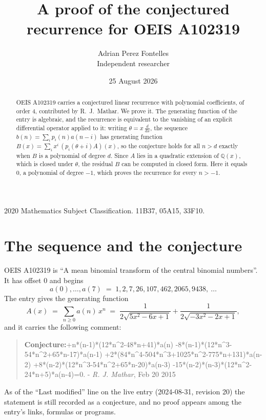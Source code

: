\documentclass[11pt,a4paper]{article}
\title{A proof of the conjectured recurrence for OEIS A102319}
\author{Adrian Perez Fontelles\\ \small Independent researcher}
\date{25 August 2026}
\theoremstyle{plain}
\theoremstyle{definition}
\begin{document}
\maketitle

\begin{abstract}
OEIS A102319 carries a conjectured linear recurrence with polynomial coefficients, of
order 4, contributed by R.~J.~Mathar. We prove it. The generating function of the
entry is algebraic, and the recurrence is equivalent to the vanishing of an explicit
differential operator applied to it: writing $\theta=x\,\frac{d}{dx}$, the sequence
$b(n)=\sum_{i}p_{i}(n)a(n-i)$ has generating function
$B(x)=\sum_{i}x^{i}\,(p_{i}(\theta+i)A)(x)$, so the conjecture holds for all $n>d$ exactly
when $B$ is a polynomial of degree $d$. Since $A$ lies in a quadratic extension of
$\mathbb{Q}(x)$, which is closed under $\theta$, the residual $B$ can be computed in
closed form. Here it equals $0$, a polynomial of degree $-1$, which proves
the recurrence for every $n>-1$.
\end{abstract}

\noindent\small 2020 Mathematics Subject Classification. 11B37, 05A15, 33F10.\normalsize

\section{The sequence and the conjecture}

OEIS A102319 is ``A mean binomial transform of the central binomial numbers''. It has offset $0$ and begins
\[
a(0),\dots,a(7)\;=\;1, 2, 7, 26, 107, 462, 2065, 9438,\ \dots
\]
The entry gives the generating function
\begin{equation}\label{eq:gf}
A(x)\;=\;\sum_{n\ge 0} a(n)\,x^{n}\;=\;\frac{1}{2 \sqrt{5 x^{2} - 6 x + 1}} + \frac{1}{2 \sqrt{- 3 x^{2} - 2 x + 1}} ,
\end{equation}
and it carries the following comment:
\begin{quote}\small
\textbf{Conjecture:}+n*(n-1)*(12*n\^{}2-48*n+41)*a(n) -8*(n-1)*(12*n\^{}3-54*n\^{}2+65*n-17)*a(n-1) +2*(84*n\^{}4-504*n\^{}3+1025*n\^{}2-775*n+131)*a(n-2) +8*(n-2)*(12*n\^{}3-54*n\^{}2+65*n-20)*a(n-3) -15*(n-2)*(n-3)*(12*n\^{}2-24*n+5)*a(n-4)=0. - \emph{R. J. Mathar}, Feb 20 2015
\end{quote}
As of the ``Last modified'' line on the live entry (2024-08-31, revision 20) the
statement is still recorded as a conjecture, and no proof appears among the entry's links,
formulas or programs.
\end{document}
